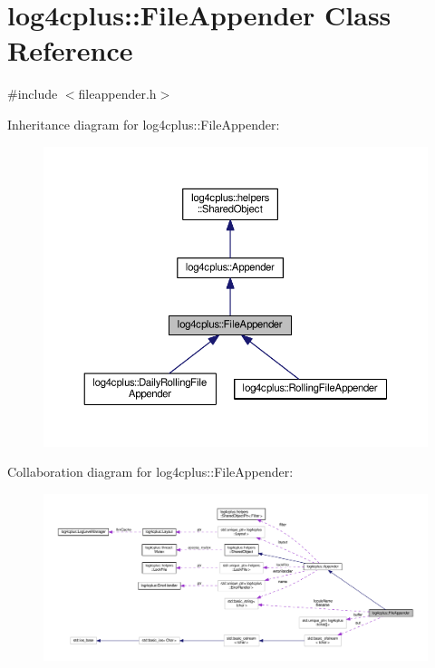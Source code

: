\hypertarget{classlog4cplus_1_1FileAppender}{\section{log4cplus\-:\-:File\-Appender Class Reference}
\label{classlog4cplus_1_1FileAppender}
}


{\ttfamily \#include $<$fileappender.\-h$>$}



Inheritance diagram for log4cplus\-:\-:File\-Appender\-:
\nopagebreak
\begin{figure}[H]
\begin{center}
\leavevmode
\includegraphics[width=350pt]{classlog4cplus_1_1FileAppender__inherit__graph}
\end{center}
\end{figure}


Collaboration diagram for log4cplus\-:\-:File\-Appender\-:
\nopagebreak
\begin{figure}[H]
\begin{center}
\leavevmode
\includegraphics[width=350pt]{classlog4cplus_1_1FileAppender__coll__graph}
\end{center}
\end{figure}
